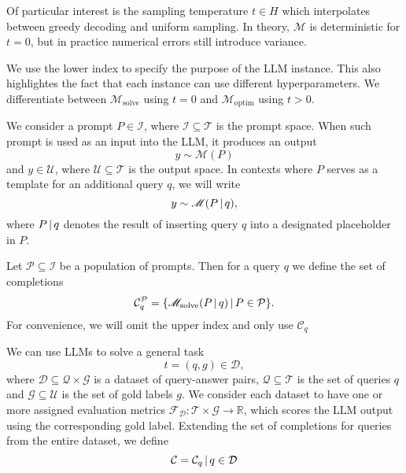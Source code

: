 Of particular interest is the sampling temperature $t \in H$ which interpolates between greedy decoding and uniform sampling.
In theory, $\mathscr{M}$ is deterministic for $t=0$, but in practice numerical errors still introduce variance.

We use the lower index to specify the purpose of the LLM instance. This also highlightes
the fact that each instance can use different hyperparameters. We differentiate between $\mathscr{M}_{\text{solve}}$ using $t=0$ and 
$\mathscr{M}_{\text{optim}}$ using $t>0$. 

We consider a prompt $P \in \mathcal{I}$, where $\mathcal{I} \subseteq \mathcal{T}$ is the prompt space.
When such prompt is used as an input into the LLM, it produces an output
\begin{equation}
    y \sim \mathscr{M}(P)
\end{equation}
and $y \in \mathcal{U}$, where
$\mathcal{U} \subseteq \mathcal{T}$ is the output space.
In contexts where $P$ serves as a template for an additional query $q$, we will write
\begin{equation}
    y \sim \mathscr{M}(P\, \vert \, q),
\end{equation}
where $P \, \vert \, q$ denotes the result of inserting query $q$ into a designated placeholder in $P$.

Let $\mathcal{P} \subseteq \mathcal{I}$ be a population of prompts. Then for a query $q$ we define the set of completions 
\begin{equation}
    \mathcal{C}_{q}^{\mathcal{P}} = \{\mathscr{M}_{\text{solve}}(P\, \vert \, q)\, \vert \, P \in \mathcal{P}\}.
\end{equation}
For convenience, we will omit the upper index and only use $\mathcal{C}_{q}$

We can use LLMs to solve a general task
\begin{equation}
    t = (q, g) \in \mathcal{D},
\end{equation}
where $\mathcal{D} \subseteq \mathcal{Q} \times \mathcal{G}$ is a dataset of query-answer pairs, $\mathcal{Q}\subseteq\mathcal{T}$ is the set of queries $q$
and $\mathcal{G}\subseteq\mathcal{U}$ is the set of gold labels $g$.
We consider each dataset to have one or more assigned evaluation metrics $\mathscr{F}_{\mathcal{D}}: \mathcal{T} \times \mathcal{G} \rightarrow \mathbb{R}$,
which scores the LLM output using the corresponding gold label. 
Extending the set of completions for queries from the entire dataset, we define
\begin{equation}
    \mathcal{C} = {\mathcal{C}_{q}\, \vert \, q \in \mathcal{D}}
\end{equation}

